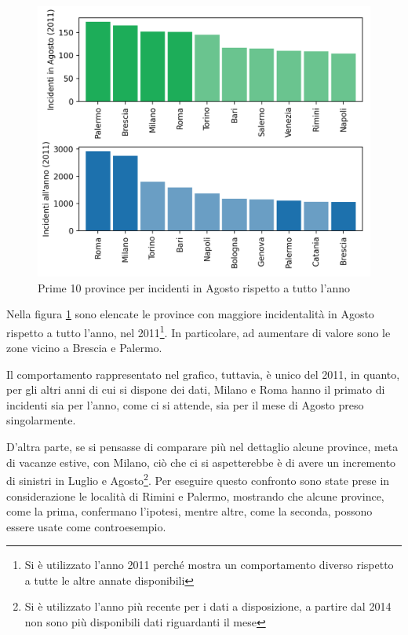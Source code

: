 \documentclass[a4paper,12pt]{report}
\begin{document}
\begin{figure}
    \includegraphics[width=\linewidth]{../src/incidenti/incidenti_senza_coords/mese_incidenti/mesi_estivi.png}
    \caption{Prime 10 province per incidenti in Agosto rispetto a tutto l'anno}
    \label{fig:mesi-estivi}
\end{figure}

Nella figura \ref{fig:mesi-estivi} sono elencate le province con maggiore incidentalità 
in Agosto rispetto a tutto l'anno, nel 
2011\footnote{Si è utilizzato l'anno 2011 perché mostra un comportamento diverso rispetto a 
tutte le altre annate disponibili}. 
In particolare, ad aumentare di valore sono le zone vicino a Brescia e Palermo. 

Il comportamento rappresentato nel grafico, tuttavia, è unico del 2011, in quanto, 
per gli altri anni di cui si dispone dei dati, 
Milano e Roma hanno il primato di incidenti sia per l'anno, come ci si attende, sia per il 
mese di Agosto preso singolarmente. 


D'altra parte, se si pensasse di comparare più nel dettaglio alcune province, 
meta di vacanze estive, con Milano, ciò che ci si aspetterebbe è 
di avere un incremento di sinistri in Luglio e 
Agosto\footnote{Si è utilizzato l'anno più recente per i dati a disposizione, 
a partire dal 2014 non sono più disponibili dati riguardanti il mese}. 
Per eseguire questo confronto sono state prese in considerazione le 
località di Rimini e Palermo, mostrando che alcune province, come la prima, 
confermano l'ipotesi, mentre altre, 
come la seconda, possono essere usate come controesempio. 
\end{document}
